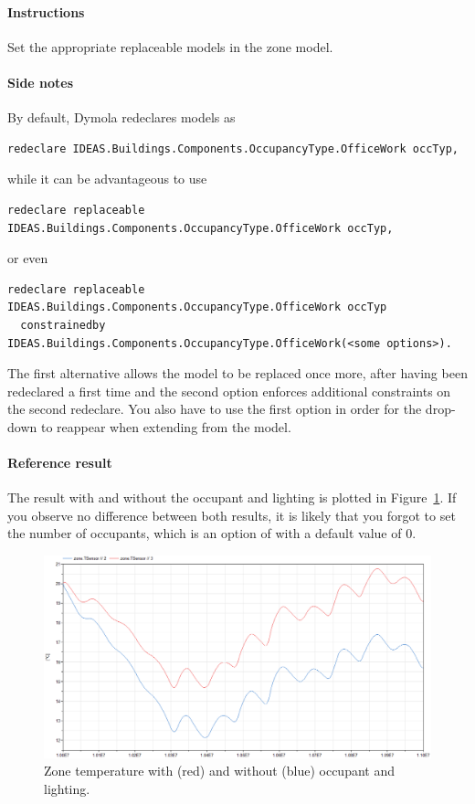 \documentclass[10pt,a4paper]{article}
\begin{document}
\paragraph{Instructions}
Set the appropriate replaceable models in the zone model.

\paragraph{Side notes}
By default, Dymola redeclares models as
\begin{verbatim}
redeclare IDEAS.Buildings.Components.OccupancyType.OfficeWork occTyp,
\end{verbatim}
while it can be advantageous to use
\begin{verbatim}
redeclare replaceable IDEAS.Buildings.Components.OccupancyType.OfficeWork occTyp,
\end{verbatim}
or even
\begin{verbatim}
redeclare replaceable IDEAS.Buildings.Components.OccupancyType.OfficeWork occTyp
  constrainedby IDEAS.Buildings.Components.OccupancyType.OfficeWork(<some options>).
\end{verbatim}
The first alternative allows the model to be replaced once more, 
after having been redeclared a first time and the second option
enforces additional constraints on the second redeclare.
You also have to use the first option in order for the drop-down
to reappear when extending from the model.

\paragraph{Reference result}
The result with and without the occupant and lighting
is plotted in Figure~\ref{fig:res3}.
If you observe no difference between both results, 
it is likely that you forgot to set the number of occupants,
which is an option of 
with a default value of 0.


\begin{figure}
\centering
\includegraphics[scale=0.6]{Example3.png}
\caption{Zone temperature with (red) and without (blue) occupant and lighting.}
\label{fig:res3}
\end{figure}
\end{document}
